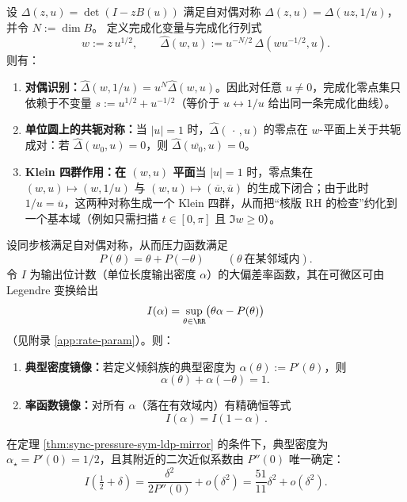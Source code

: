 \begin{remark}\label{prop:completed-zero-symmetry}
设 \(\Delta(z,u)=\det(I-zB(u))\) 满足自对偶对称 \(\Delta(z,u)=\Delta(uz,1/u)\)，并令 \(N:=\dim B\)。
定义完成化变量与完成化行列式
\[
w:=z\,u^{1/2},\qquad
\widehat{\Delta}(w,u):=u^{-N/2}\,\Delta(wu^{-1/2},u).
\]
则有：
\begin{enumerate}
  \item \textbf{对偶识别：}\(\widehat{\Delta}(w,1/u)=u^{N}\widehat{\Delta}(w,u)\)。因此对任意 \(u\neq 0\)，完成化零点集只依赖于不变量
  \(s:=u^{1/2}+u^{-1/2}\)（等价于 \(u\leftrightarrow 1/u\) 给出同一条完成化曲线）。
  \item \textbf{单位圆上的共轭对称：}当 \(|u|=1\) 时，\(\widehat{\Delta}(\,\cdot\,,u)\) 的零点在 \(w\)-平面上关于共轭成对：若 \(\widehat{\Delta}(w_0,u)=0\)，则 \(\widehat{\Delta}(\overline{w_0},u)=0\)。
  \item \textbf{Klein 四群作用：在 \((w,u)\) 平面}当 \(|u|=1\) 时，零点集在
  \((w,u)\mapsto (w,1/u)\) 与 \((w,u)\mapsto(\overline{w},\overline{u})\) 的生成下闭合；由于此时 \(1/u=\overline{u}\)，这两种对称生成一个 Klein 四群，从而把“核版 RH 的检查”约化到一个基本域（例如只需扫描 \(t\in[0,\pi]\) 且 \(\Im w\ge 0\)）。
\end{enumerate}
\end{remark}

\begin{remark}[压力对称 \texorpdfstring{$\Rightarrow$}{=>} 大偏差谱的精确镜像]\label{thm:sync-pressure-sym-ldp-mirror}
设同步核满足自对偶对称，从而压力函数满足
\[
P(\theta)=\theta+P(-\theta)
\qquad(\theta\ \text{在某邻域内}).
\]
令 \(I\) 为输出位计数（单位长度输出密度 \(\alpha\)）的大偏差率函数，其在可微区可由 Legendre 变换给出
\[
I(\alpha)=\sup_{\theta\in\RR}\bigl(\theta\alpha-P(\theta)\bigr)
\]
（见附录 \ref{app:rate-param}）。则：
\begin{enumerate}
  \item \textbf{典型密度镜像：}若定义倾斜族的典型密度为 \(\alpha(\theta):=P'(\theta)\)，则
  \[
  \alpha(\theta)+\alpha(-\theta)=1.
  \]
  \item \textbf{率函数镜像：}对所有 \(\alpha\)（落在有效域内）有精确恒等式
  \[
  \boxed{\ I(\alpha)=I(1-\alpha)\ }.
  \]
\end{enumerate}
\end{remark}

\begin{remark}\label{cor:sync-ldp-quadratic-locked}
在定理 \ref{thm:sync-pressure-sym-ldp-mirror} 的条件下，典型密度为 \(\alpha_\star=P'(0)=1/2\)，且其附近的二次近似系数由 \(P''(0)\) 唯一确定：
\[
I\!\left(\tfrac12+\delta\right)=\frac{\delta^2}{2P''(0)}+o(\delta^2)
=\frac{51}{11}\delta^2+o(\delta^2).
\]
\end{remark}


